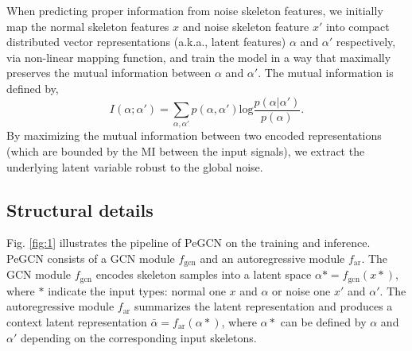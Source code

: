 \documentclass[runningheads]{llncs}
\begin{document}
When predicting proper information from noise skeleton features, we initially map the normal skeleton features $x$ and noise skeleton feature $x'$ into compact distributed vector representations (a.k.a., latent features) $\alpha$ and $\alpha'$ respectively, via non-linear mapping function, and train the model in a way that maximally preserves the mutual information between $\alpha$ and $\alpha'$. The mutual information is defined by, 
\begin{equation}
I(\alpha;\alpha') = \sum_{\alpha,\alpha'}p(\alpha,\alpha')\text{log}\frac{p(\alpha|\alpha')}{p(\alpha)}.
 \label{eq:mutual_info}
\end{equation}
By maximizing the mutual information between two encoded representations (which are bounded by the MI between the input signals), we extract the underlying latent variable robust to the global noise. 

\subsection{Structural details}
Fig. \ref{fig:1} illustrates the pipeline of PeGCN on the training and inference. PeGCN consists of a GCN module $f_{\text{gcn}}$ and an autoregressive module $f_{\text{ar}}$. The GCN module $f_{\text{gcn}}$ encodes skeleton samples into a latent space $\alpha* = f_{\text{gcn}}(x*)$, where $*$ indicate the input types: normal one $x$ and $\alpha$ or noise one $x'$ and $\alpha'$. The autoregressive module $f_{\text{ar}}$ summarizes the latent representation and produces a context latent representation $\bar{\alpha}=f_{\text{ar}}(\alpha*)$, where $\alpha*$ can be defined by $\alpha$ and $\alpha'$ depending on the corresponding input skeletons. 
\end{document}
